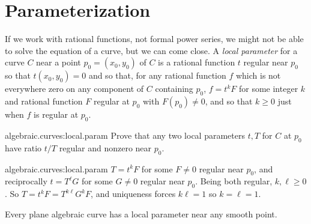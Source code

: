 \section{Parameterization}
If we work with rational functions, not formal power series, we might not be able to solve the equation of a curve, but we can come close.
A \emph{local parameter} for a curve \(C\) near a point \(p_0=(x_0,y_0)\) of \(C\) is a rational function \(t\) regular near \(p_0\) so that \(t(x_0,y_0)=0\) and so that, for any rational function \(f\) which is not everywhere zero on any component of \(C\) containing \(p_0\), \(f=t^k F\) for some integer \(k\) and rational function \(F\) regular at \(p_0\) with \(F(p_0)\ne 0\), and so that \(k\ge 0\) just when \(f\) is regular at \(p_0\).
\begin{problem}{algebraic.curves:local.param}
Prove that any two local parameters \(t,T\) for \(C\) at \(p_0\) have ratio \(t/T\) regular and nonzero near \(p_0\).
\end{problem}
\begin{answer}{algebraic.curves:local.param}
\(T=t^k F\) for some \(F\ne 0\) regular near \(p_0\), and reciprocally \(t=T^{\ell} G\) for some \(G\ne 0\) regular near \(p_0\).
Being both regular, \(k,\ell\ge 0\).
So \(T=t^k F=T^{k\ell} G^k F\), and uniqueness forces \(k\ell=1\) so \(k=\ell=1\).
\end{answer}
\begin{theorem}
Every plane algebraic curve has a local parameter near any smooth point.
\end{theorem}
